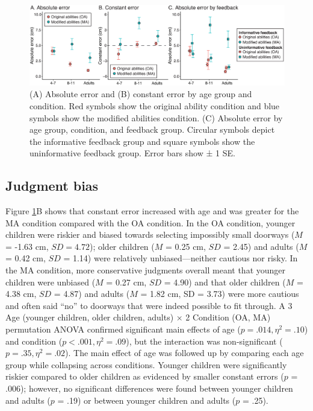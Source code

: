 \documentclass[a4paper,man,natbib,floatsintext,noextraspace]{apa6}
\begin{document}
\begin{figure}[htb!]
\centering
\includegraphics[width=1\textwidth]{error.eps}
\caption{\label{fig:error}(A) Absolute error and (B) constant error by age group and condition. Red symbols show the original ability condition and blue symbols show the modified abilities condition. (C) Absolute error by age group, condition, and feedback group. Circular symbols depict the informative feedback group and square symbols show the uninformative feedback group. Error bars show ± 1 SE.}
\end{figure}

\subsection{Judgment bias}

Figure \ref{fig:error}B shows that constant error increased with age and was greater for the MA condition compared with the OA condition. In the OA condition, younger children were riskier and biased towards selecting impossibly small doorways ($M$ = -1.63 cm, $SD = 4.72$); older children ($M$ = 0.25 cm, $SD$ = 2.45) and adults ($M$ = 0.42 cm, $SD$ = 1.14) were relatively unbiased---neither cautious nor risky. In the MA condition, more conservative judgments overall meant that younger children were unbiased ($M$ = 0.27 cm, $SD$ = 4.90) and that older children ($M$ = 4.38 cm, $SD$ = 4.87) and adults ($M$ = 1.82 cm, SD = 3.73) were more cautious and often said “no” to doorways that were indeed possible to fit through. A 3 Age (younger children, older children, adults) × 2 Condition (OA, MA) permutation ANOVA confirmed significant main effects of age ($p = .014, \eta^{2} = .10$) and condition ($p < .001, \eta^{2} = .09$), but the interaction was non-significant ($p = .35, \eta^{2} = .02$). The main effect of age was followed up by comparing each age group while collapsing across conditions. Younger children were significantly riskier compared to older children as evidenced by smaller constant errors ($p$ = .006); however, no significant differences were found between younger children and adults ($p$ = .19) or between younger children and adults ($p$ = .25).
\end{document}
